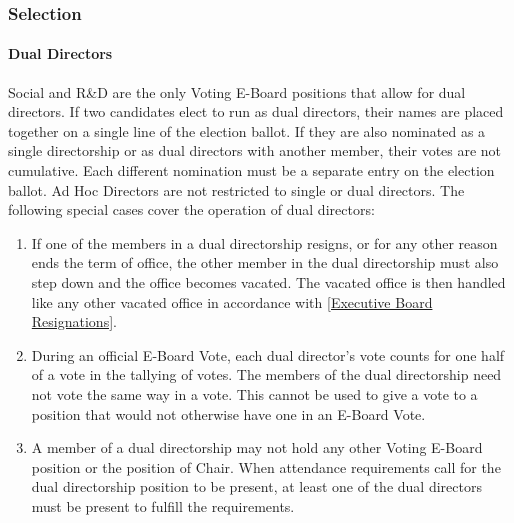 \documentclass{article}
\newcommand{\asubsection}[1]{\subsubsection{#1} \label{#1}}
\newcommand{\asubsubsection}[1]{\paragraph{#1} \label{#1}}
\begin{document}
\asubsection{Selection}

\asubsubsection{Dual Directors}
Social and R\&D are the only Voting E-Board positions that allow for dual directors.
If two candidates elect to run as dual directors, their names are placed together on a single line of the election ballot.
If they are also nominated as a single directorship or as dual directors with another member, their votes are not cumulative.
Each different nomination must be a separate entry on the election ballot.
Ad Hoc Directors are not restricted to single or dual directors.
The following special cases cover the operation of dual directors:
\begin{enumerate}
	\item If one of the members in a dual directorship resigns, or for any other reason ends the term of office, the other member in the dual directorship must also step down and the office becomes vacated.
	      The vacated office is then handled like any other vacated office in accordance with \ref{Executive Board Resignations}.
	\item During an official E-Board Vote, each dual director's vote counts for one half of a vote in the tallying of votes.
	      The members of the dual directorship need not vote the same way in a vote.
	      This cannot be used to give a vote to a position that would not otherwise have one in an E-Board Vote.
	\item A member of a dual directorship may not hold any other Voting E-Board position or the position of Chair.
	      When attendance requirements call for the dual directorship position to be present, at least one of the dual directors must be present to fulfill the requirements.
\end{enumerate}
\end{document}
